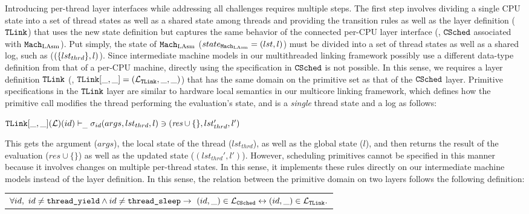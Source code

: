 Introducing per-thread layer interfaces while addressing all challenges requires multiple steps. 
The first step involves dividing 
 a single CPU state into a set of thread states as well as a shared state among threads
and providing 
the transition rules as well as the layer definition (${{\mathrm{\texttt{TLink}}}}$) that uses the new state definition but captures 
the same behavior of the connected per-CPU layer interface (\ie, ${{\mathrm{\texttt{CSched}}}}$ associated with ${\mathrm{\texttt{Mach}}}_{\mathrm{LAsm}}$).
Put simply, the state of ${\mathrm{\texttt{Mach}}}_{\mathrm{LAsm}}$ ($state_{{\mathrm{\texttt{Mach}}}_{\mathrm{LAsm}}} = (lst, l)$) 
must be divided into a set of thread states as well as a shared log, such as  ($(\{lst_{thrd}\}, l)$).
Since intermediate machine models in our multithreaded linking framework possibly use a different data-type definition from that of a per-CPU machine, 
directly using the specification in  ${{\mathrm{\texttt{CSched}}}}$ is not possible. 
In this sense, 
we requires a layer definition ${{\mathrm{\texttt{TLink}}}}$ (\ie, ${{\mathrm{\texttt{TLink}}}}[\_, \_] = (\mathcal{L}_{{{\mathrm{\texttt{TLink}}}}}, \_, \_)$) that has the same domain on the primitive set as that of the ${{\mathrm{\texttt{CSched}}}}$ layer.
Primitive specifications in the ${{\mathrm{\texttt{TLink}}}}$ layer are similar to hardware local semantics in our multicore linking framework,
which defines how the primitive call modifies the thread performing the evaluation’s state, and is a \textit{single} thread state and a log as follows:
\begin{center}
${{\mathrm{\texttt{TLink}}}}[\_, \_](\mathcal{L})(id)
 \vdash_{\_}  \sigma_{id}(args, lst_{thrd}, l) \ni (\textit{res}\cup \{\}, lst_{thrd}', l')$
\end{center}
This gets the argument  ($args$), the local state of the thread ($lst_{thrd}$), as well as  the global state ($l$), and then 
returns the result of the evaluation ($\textit{res}\cup \{\}$) as well as the updated state ($(lst_{thrd}', l')$).
However, scheduling primitives cannot be specified in this manner because it involves changes on multiple per-thread states. 
 In this sense, it implements these rules directly on our intermediate machine models instead of the layer definition. 
 In this sense, the relation between the primitive domain on two layers follows the following definition:

%

\begin{definition}
\label{definition:chapter:conlink:same-domain-sched-tlink}
\begin{tabular}{P{0.95\textwidth}}
$\forall id,\ id \neq {\mathrm{\texttt{thread\_yield}}} \wedge id \neq {\mathrm{\texttt{thread\_sleep}}} \rightarrow 
 \ (id, \_) \in \mathcal{L}_{{{\mathrm{\texttt{CSched}}}}} \leftrightarrow (id, \_) \in  \mathcal{L}_{{{\mathrm{\texttt{TLink}}}}}.$\\
\end{tabular}
\end{definition}



